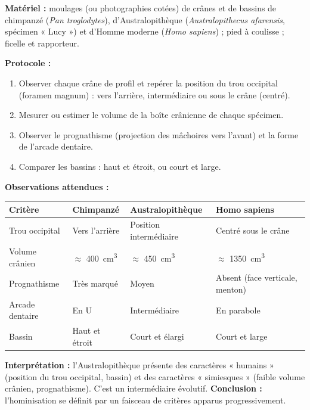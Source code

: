 \documentclass[11pt]{article}
\newcommand{\cle}[1]{{\popxbold\color{popdark}#1}}
\begin{document}
\begin{experience}
\textbf{Matériel :} moulages (ou photographies cotées) de crânes et de bassins de chimpanzé (\emph{Pan troglodytes}), d'Australopithèque (\emph{Australopithecus afarensis}, spécimen « Lucy ») et d'Homme moderne (\emph{Homo sapiens}) ; pied à coulisse ; ficelle et rapporteur.

\textbf{Protocole :}
\begin{enumerate}
\item Observer chaque crâne de profil et repérer la position du \cle{trou occipital} (foramen magnum) : vers l'arrière, intermédiaire ou sous le crâne (centré).
\item Mesurer ou estimer le volume de la boîte crânienne de chaque spécimen.
\item Observer le prognathisme (projection des mâchoires vers l'avant) et la forme de l'arcade dentaire.
\item Comparer les bassins : haut et étroit, ou court et large.
\end{enumerate}

\textbf{Observations attendues :}

\begin{center}
\begin{tabularx}{\linewidth}{|l|X|X|X|}
\hline
\rowcolor{popblueL} \textbf{Critère} & \textbf{Chimpanzé} & \textbf{Australopithèque} & \textbf{Homo sapiens} \\
\hline
Trou occipital & Vers l'arrière & Position intermédiaire & Centré sous le crâne \\
\hline
Volume crânien & $\approx$ \SI{400}{cm^3} & $\approx$ \SI{450}{cm^3} & $\approx$ \SI{1350}{cm^3} \\
\hline
Prognathisme & Très marqué & Moyen & Absent (face verticale, menton) \\
\hline
Arcade dentaire & En U & Intermédiaire & En parabole \\
\hline
Bassin & Haut et étroit & Court et élargi & Court et large \\
\hline
\end{tabularx}
\end{center}

\textbf{Interprétation :} l'Australopithèque présente des caractères « humains » (position du trou occipital, bassin) et des caractères « simiesques » (faible volume crânien, prognathisme). C'est un \cle{intermédiaire évolutif}. \textbf{Conclusion :} l'hominisation se définit par un faisceau de critères apparus progressivement.
\end{experience}
\end{document}
